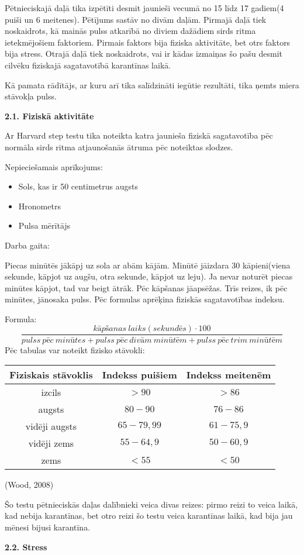 \documentclass[12pt]{article}
\begin{document}
Pētnieciskajā daļā tika izpētīti desmit jaunieši vecumā no 15 līdz 17 gadiem(4 puiši un 6 meitenes). Pētījums sastāv no divām daļām. Pirmajā daļā tiek noskaidrots, kā mainās pulss atkarībā no diviem  dažādiem sirds ritma ietekmējošiem faktoriem. Pirmais faktors bija fiziska aktivitāte, bet otrs faktors bija stress. Otrajā daļā tiek noskaidrots, vai ir kādas izmaiņas šo pašu desmit cilvēku fiziskajā sagatavotībā karantīnas laikā.\par
Kā pamata rādītājs, ar kuru arī tika salīdzināti iegūtie rezultāti, tika ņemts miera stāvokļa pulss.

\begin{center}
\fontsize{14}{}\selectfont\textbf{2.1. Fiziskā aktivitāte}
\end{center}

Ar Harvard step testu tika noteikta katra jaunieša fiziskā sagatavotība pēc normāla sirds ritma atjaunošanās ātruma pēc noteiktas slodzes. \par
Nepieciešamais aprīkojums:
\begin{itemize}
\setlength\itemsep{0em}
  \item Sols, kas ir 50 centimetrus augsts
  \item Hronometrs
  \item Pulsa mērītājs
\end{itemize}

Darba gaita:\par
Piecas minūtēs jākāpj uz sola ar abām kājām. Minūtē jāizdara 30 kāpieni(viena sekunde, kāpjot uz augšu, otra sekunde, kāpjot uz leju). Ja nevar noturēt piecas minūtes kāpjot, tad var beigt ātrāk. Pēc kāpšanas jāapsēžas. Trīs reizes, ik pēc minūtes, jānosaka pulss. Pēc formulas aprēķina fiziskās sagatavotības indeksu.\par
Formula:
$$\frac{kāpšanas\ laiks(sekundēs)\cdot 100}{pulss\  pēc\  minūtes + pulss\ pēc\ divām\ minūtēm + pulss\ pēc\ trim\ minūtēm}$$
Pēc tabulas var noteikt fizisko stāvokli: 
\begin{center}
    \begin{tabular}{|c|c|c|}
    \hline
    Fiziskais stāvoklis & Indekss puišiem & Indekss meitenēm\\\hline
    izcils & $>90$ & $>86$\\\hline
    augsts & $80-90$ & $76-86$\\\hline
    vidēji augsts & $65-79,99$ & $61-75,9$\\\hline
    vidēji zems & $55-64,9$ & $50-60,9$\\\hline
    zems & $<55$ & $<50$\\
    \hline
    \end{tabular}
\end{center}
(Wood, 2008)\par
Šo testu pētnieciskās daļas dalībnieki veica divas reizes: pirmo reizi to veica laikā, kad nebija karantīnas, bet otro reizi šo testu veica karantīnas laikā, kad bija jau mēnesi bijusi karantīna. 
\begin{center}
\fontsize{14}{}\selectfont\textbf{2.2. Stress}
\end{center}
\end{document}
